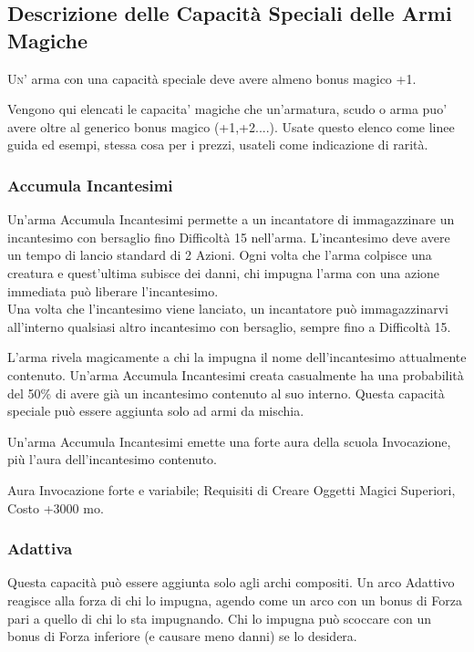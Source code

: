 \subsection{Descrizione delle Capacità Speciali delle Armi Magiche}

\lettrine[lines=2, lhang=0.33, loversize=0.25, findent=1.5em]{U}{n'} arma con una capacità speciale deve avere almeno bonus magico +1.

Vengono qui elencati le capacita' magiche che un'armatura, scudo o arma puo' avere oltre al generico bonus magico (+1,+2....). Usate questo elenco come linee guida ed esempi, stessa cosa per i prezzi, usateli come indicazione di rarità.

\begin{multicols}{2}

\subsubsection{Accumula Incantesimi}

Un'arma Accumula Incantesimi permette a un incantatore di immagazzinare un incantesimo con bersaglio fino Difficoltà 15 nell'arma. L'incantesimo deve avere un tempo di lancio standard di 2 Azioni. Ogni volta che l'arma colpisce una creatura e quest'ultima subisce dei danni, chi impugna l'arma con una azione immediata può liberare l'incantesimo.\\
Una volta che l'incantesimo viene lanciato, un incantatore può immagazzinarvi all'interno qualsiasi altro incantesimo con bersaglio, sempre fino a Difficoltà 15.

L'arma rivela magicamente a chi la impugna il nome dell'incantesimo attualmente contenuto. Un'arma Accumula Incantesimi creata casualmente ha una probabilità del 50\% di avere già un incantesimo contenuto al suo interno. Questa capacità speciale può essere aggiunta solo ad armi da mischia.

Un'arma Accumula Incantesimi emette una forte aura della scuola Invocazione, più l'aura dell'incantesimo contenuto.

Aura Invocazione forte e variabile; Requisiti di Creare Oggetti Magici Superiori, Costo +3000 mo.

\subsubsection{Adattiva}

Questa capacità può essere aggiunta solo agli archi compositi. Un arco Adattivo reagisce alla forza di chi lo impugna, agendo come un arco con un bonus di Forza pari a quello di chi lo sta impugnando. Chi lo impugna può scoccare con un bonus di Forza inferiore (e causare meno danni) se lo desidera.


\end{multicols}

